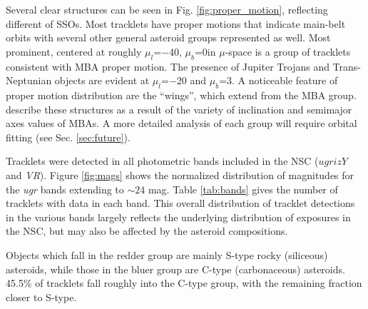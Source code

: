 \documentclass[twocolumn]{aastex62}
\begin{document}
Several clear structures can be seen in Fig. \ref{fig:proper_motion}, reflecting different  of SSOs.  Most tracklets have proper motions that indicate main-belt orbits with several other general asteroid groups represented as well.  Most prominent, centered at roughly $\mu_{l}$=$-$40\arh \editoneb{(-0.27\ded)}, $\mu_{b}$=0\arh in $\mu$-space is a group of tracklets consistent with MBA proper motion.  The presence of Jupiter Trojans and Trans-Neptunian objects are evident at $\mu_{l}$=$-$20\arh \editoneb{(-0.13\ded)} and $\mu_{b}$=3\arh \editoneb{(0.02\ded)}.  A noticeable feature of proper motion distribution are the ``wings'', which extend from the MBA group.  \cite{Terai13} describe these structures as a result of the variety of inclination and semimajor axes values of MBAs.  A more detailed analysis of each group will require orbital fitting (see Sec. \ref{sec:future}).

Tracklets were detected in all photometric bands included in the NSC ($ugrizY$ and {\em VR}).  Figure \ref{fig:mags} shows the normalized distribution of magnitudes for the \textit{ugr} bands extending to $\sim 24$ mag.  Table \ref{tab:bands} gives the number of tracklets with data in each band.  This overall distribution of tracklet detections in the various bands largely reflects the underlying distribution of exposures in the NSC, but may also be affected by the asteroid compositions.

    Objects which fall in the redder group are mainly S-type rocky (siliceous) asteroids, while those in the bluer group are C-type (carbonaceous) asteroids. 45.5\% of tracklets fall roughly into the C-type group, with the remaining fraction closer to S-type. 
\end{document}
